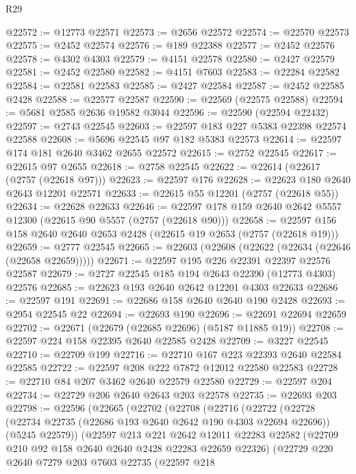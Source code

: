 \begin{lexlean}{R29}
\begin{coremodule}
@22572 := @12773 @22571
@22573 := @2656 @22572
@22574 := @22570 @22573
@22575 := @2452 @22574
@22576 := @189 @22388
@22577 := @2452 @22576
@22578 := @4302 @4303
@22579 := @4151 @22578
@22580 := @2427 @22579
@22581 := @2452 @22580
@22582 := @4151 @7603
@22583 := @22284 @22582
@22584 := @22581 @22583
@22585 := @2427 @22584
@22587 := @2452 @22585 @2428
@22588 := @22577 @22587
@22590 := @22569 (@22575 @22588)
@22594 := @5681 @2585 @2636 @19582 @3044
@22596 := @22590 (@22594 @22432)
@22597 := @2743 @22545
@22603 := @22597 @183 @227 @5383 @22398 @22574 @22588
@22608 := @5696 @22545 @97 @182 @5383 @22573
@22614 := @22597 @174 @181 @2640 @3462 @2655 @22572
@22615 := @2752 @22545
@22617 := @22615 @97 @2655
@22618 := @2758 @22545
@22622 := @22614 (@22617 (@2757 (@22618 @97)))
@22623 := @22597 @176
@22628 := @22623 @180 @2640 @2643 @12201 @22571
@22633 := @22615 @55 @12201 (@2757 (@22618 @55))
@22634 := @22628 @22633
@22646 := @22597 @178 @159 @2640 @2642 @5557 @12300 (@22615 @90 @5557 (@2757 (@22618 @90)))
@22658 := @22597 @156 @158 @2640 @2640 @2653 @2428 (@22615 @19 @2653 (@2757 (@22618 @19)))
@22659 := @2777 @22545
@22665 := @22603 (@22608 (@22622 (@22634 (@22646 (@22658 @22659)))))
@22671 := @22597 @195 @226 @22391 @22397 @22576 @22587
@22679 := @2727 @22545 @185 @194 @2643 @22390 (@12773 @4303) @22576
@22685 := @22623 @193 @2640 @2642 @12201 @4303 @22633
@22686 := @22597 @191
@22691 := @22686 @158 @2640 @2640 @190 @2428
@22693 := @2954 @22545 @22
@22694 := @22693 @190
@22696 := @22691 @22694 @22659
@22702 := @22671 (@22679 (@22685 @22696) (@5187 @11885 @19))
@22708 := @22597 @224 @158 @22395 @2640 @22585 @2428
@22709 := @3227 @22545
@22710 := @22709 @199
@22716 := @22710 @167 @223 @22393 @2640 @22584 @22585
@22722 := @22597 @208 @222 @7872 @12012 @22580 @22583
@22728 := @22710 @84 @207 @3462 @2640 @22579 @22580
@22729 := @22597 @204
@22734 := @22729 @206 @2640 @2643 @203 @22578
@22735 := @22693 @203
@22798 := @22596
    (@22665
      (@22702
        (@22708
          (@22716
            (@22722
              (@22728
                (@22734 @22735 (@22686 @193 @2640 @2642 @190 @4303 @22694 @22696))
                (@5245 @22579))
              (@22597
                @213
                @221
                @2642
                @12011
                @22283
                @22582
                (@22709 @210 @92 @158 @2640 @2640 @2428 @22283 @22659 @22326)
                (@22729
                  @220
                  @2640
                  @7279
                  @203
                  @7603
                  @22735
                  (@22597
                    @218

\end{coremodule}
\end{lexlean}
